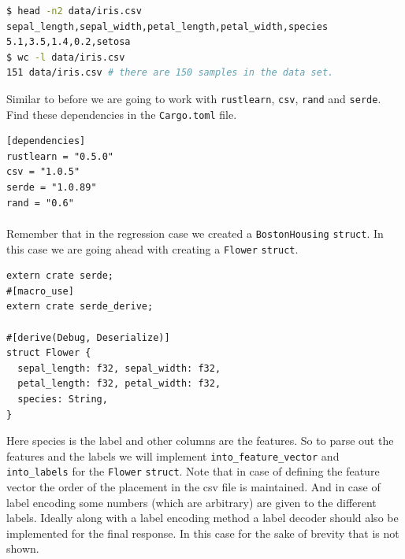 \documentclass{book}
\begin{document}
\begin{lstlisting}[language=bash,caption={iris data}]
$ head -n2 data/iris.csv
sepal_length,sepal_width,petal_length,petal_width,species
5.1,3.5,1.4,0.2,setosa
$ wc -l data/iris.csv
151 data/iris.csv # there are 150 samples in the data set.
\end{lstlisting}

Similar to before we are going to work with \lstinline{rustlearn}, \lstinline{csv}, \lstinline{rand} and \lstinline{serde}. Find these dependencies in the \lstinline{Cargo.toml} file.

\begin{lstlisting}[caption={Cargo\\.toml}]
[dependencies]
rustlearn = "0.5.0"
csv = "1.0.5"
serde = "1.0.89"
rand = "0.6"

\end{lstlisting}

\paragraph{}%
Remember that in the regression case we created a \lstinline{BostonHousing} \lstinline{struct}. In this case we are going ahead with creating a \lstinline{Flower} \lstinline{struct}.
\label{par:}

\begin{lstlisting}[caption={ml\\-utils\\/src\\/datasets\\.rs}]
extern crate serde;
#[macro_use]
extern crate serde_derive;

#[derive(Debug, Deserialize)]
struct Flower {
  sepal_length: f32, sepal_width: f32,
  petal_length: f32, petal_width: f32,
  species: String,
}
\end{lstlisting}

Here species is the label and other columns are the features. So to parse out the features and the labels we will implement \lstinline{into_feature_vector} and \lstinline{into_labels} for the \lstinline{Flower} \lstinline{struct}. Note that in case of defining the feature vector the order of the placement in the csv file is maintained. And in case of label encoding some numbers (which are arbitrary) are given to the different labels. Ideally along with a label encoding method a label decoder should also be implemented for the final response. In this case for the sake of brevity that is not shown.
\end{document}
